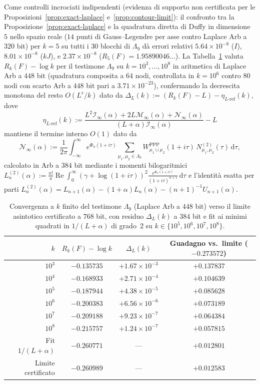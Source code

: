 \documentclass[11pt, reqno]{amsart}
\theoremstyle{remark}
\numberwithin{equation}{section}
\DeclareMathOperator{\re}{Re}
\newcommand{\dd}{\,\mathrm{d}}
\begin{document}
Come controlli incrociati indipendenti (evidenza di supporto non certificata per le Proposizioni~\ref{prop:exact-laplace}
e~\ref{prop:contour-limit}): il confronto tra la Proposizione~\ref{prop:exact-laplace} e la quadratura diretta
di Duffy in dimensione $5$ nello spazio reale ($14$ punti di Gauss--Legendre per asse contro Laplace Arb a
$320$ bit) per $k = 5$ su tutti i $30$ blocchi di $\Lambda_9$ dà errori relativi $5.64 \times 10^{-8}$ ($I$),
$8.01 \times 10^{-8}$ ($kJ$), e $2.37 \times 10^{-8}$ ($R_5(F) = 1.95890046\dots$). La Tabella~\ref{tab:finite-k}
valuta $R_k(F) - \log k$ per il testimone $\Lambda_9$ su $k = 10^3,\dots,10^8$ in aritmetica di Laplace Arb
a $448$ bit (quadratura composita a $64$ nodi, controllata in $k = 10^6$ contro $80$ nodi con scarto Arb a
$448$ bit pari a $3.71 \times 10^{-23}$), confermando la decrescita monotona del resto $O(L^r/k)$ dato da
$\Delta_L(k) := (R_k(F) - L) - \eta_{L\text{-ref}}(k)$, dove
\[
\eta_{L\text{-ref}}(k) := \frac{L^2\mathcal{I}_\infty(\alpha) + 2L\mathcal{M}_\infty(\alpha) + \mathcal{N}_\infty(\alpha)}{(L+\alpha)\mathcal{I}_\infty(\alpha)} - L
\]
mantiene il termine interno $O(1)$ dato da
\[
\mathcal{N}_\infty(\alpha) := \frac{1}{2\pi}\int_{-\infty}^\infty e^{\Phi_\alpha(1+i\tau)}
\sum_{\mu_1,\mu_2\in\Lambda_9} W_{\mu_1\sqcup\mu_2}^{\mathrm{PPP}}(1+i\tau)\, N_{\mu_1,\mu_2}^{(2)}(\tau)\dd\tau,
\]
calcolato in Arb a $384$ bit mediante i momenti bilogaritmici
$L_n^{(2)}(\alpha) := \frac{n!}{\pi}\re\int_0^\infty (\gamma+\log(1+i\tau))^2 \frac{e^{\Phi_\alpha(1+i\tau)}}{(1+i\tau)^{n+1}}\dd\tau$
e l'identità esatta per parti $L_n^{(2)}(\alpha) = L_{n+1}(\alpha) - (1+\alpha)L_n(\alpha) - (n+1)^{-1}U_{n+1}(\alpha)$.

\begin{table}[ht]
\centering
\caption{Convergenza a $k$ finito del testimone $\Lambda_9$ (Laplace Arb a $448$ bit) verso il
limite asintotico certificato a $768$ bit, con residuo $\Delta_L(k)$ a $384$ bit e fit ai minimi
quadrati in $1/(L+\alpha)$ di grado~$2$ su $k \in \{10^5, 10^6, 10^7, 10^8\}$.}\label{tab:finite-k}
\small
\setlength{\tabcolsep}{7pt}
\begin{tabular}{@{}rccc@{}}
\toprule
$k$ & $R_k(F) - \log k$ & $\Delta_L(k)$ & Guadagno vs.\ limite \cite{Lewulis} ($-0.273572$) \\
\midrule
$10^3$ & $-0.135735$ & $+1.67 \times 10^{-3}$ & $+0.137837$ \\
$10^4$ & $-0.168933$ & $+2.71 \times 10^{-4}$ & $+0.104639$ \\
$10^5$ & $-0.187944$ & $+4.38 \times 10^{-5}$ & $+0.085628$ \\
$10^6$ & $-0.200383$ & $+6.56 \times 10^{-6}$ & $+0.073189$ \\
$10^7$ & $-0.209188$ & $+9.23 \times 10^{-7}$ & $+0.064384$ \\
$10^8$ & $-0.215757$ & $+1.24 \times 10^{-7}$ & $+0.057815$ \\
\midrule
Fit $1/(L+\alpha)$ & $-0.260771$ & --- & $+0.012801$ \\
Limite certificato & $\mathbf{-0.260989}$ & --- & $\mathbf{+0.012583}$ \\
\bottomrule
\end{tabular}
\end{table}
\end{document}
